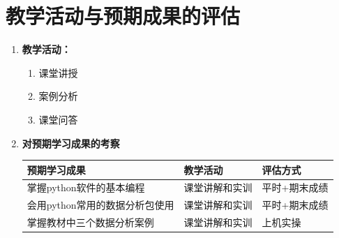 \documentclass[12pt,a4paper,openany,cap]{ctexbook}
\begin{document}
\section{教学活动与预期成果的评估}
\begin{enumerate}
\item\label{item:24} \textbf{教学活动：}
\begin{enumerate}
\item\label{item:26} 课堂讲授
\item\label{item:27} 案例分析
\item\label{item:29} 课堂问答
\end{enumerate}
\item\label{item:32} \textbf{对预期学习成果的考察}\\ 

  \begin{tabular}[h]{|l|l|l|}\hline
    \textbf{预期学习成果}& \textbf{教学活动}& \textbf{评估方式}\\ \hline
                       掌握python软件的基本编程  & 课堂讲解和实训  & 平时+期末成绩 \\ \hline
                        会用python常用的数据分析包使用 & 课堂讲解和实训 &  平时+期末成绩\\ \hline
                        掌握教材中三个数据分析案例 & 课堂讲解和实训 & 上机实操  \\ \hline
      \end{tabular}
\end{enumerate}
\end{document}
